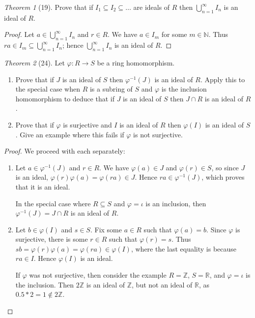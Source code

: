 \documentclass[12pt]{article}
\theoremstyle{remark}
\theoremstyle{named}
\newtheorem*{theorem}{Theorem}
\newcommand{\Z}{\mathbb Z}
\begin{document}
\begin{theorem}[19]
    Prove that if \(I_1 \subseteq I_2 \subseteq \dots\) are ideals of \(R\) then \(\bigcup_{n = 1}^\infty I_n\) is an ideal of \(R\).
\end{theorem}

\begin{proof}
    Let \(a \in \bigcup_{n = 1}^\infty I_n\) and \(r \in R\). We have \(a \in I_m\) for some \(m \in \mathbb N\). Thus \(ra \in I_m \subseteq \bigcup_{n = 1}^\infty I_n\); hence \(\bigcup_{n = 1}^\infty I_n\) is an ideal of \(R\).
\end{proof}


\begin{theorem}[24]
    Let \(\varphi : R \to S\) be a ring homomorphism.
    \begin{enumerate}
        \item Prove that if \(J\) is an ideal of \(S\) then \(\varphi^{-1}(J)\) is an ideal of \(R\). Apply this to the special case when \(R\) is a subring of \(S\) and \(\varphi\) is the inclusion homomorphism to deduce that if \(J\) is an ideal of \(S\) then \(J \cap R\) is an ideal of \(R\). 
        \item Prove that if \(\varphi\) is surjective and \(I\) is an ideal of \(R\) then \(\varphi(I)\) is an ideal of \(S\). Give an example where this fails if \(\varphi\) is not surjective.
    \end{enumerate}
\end{theorem}

\begin{proof}
    We proceed with each separately:
    \begin{enumerate}
        \item Let \(a \in \varphi^{-1}(J)\) and \(r \in R\). We have \(\varphi(a) \in J\) and \(\varphi(r) \in S\), so since \(J\) is an ideal, \(\varphi(r)\varphi(a) = \varphi(ra) \in J\). Hence \(ra \in \varphi^{-1}(J)\), which proves that it is an ideal. 
        
        In the special case where \(R \subseteq S\) and \(\varphi = \iota\) is an inclusion, then \(\varphi^{-1}(J) = J \cap R\) is an ideal of \(R\).

        \item Let \(b \in \varphi(I)\) and \(s \in S\). Fix some \(a \in R\) such that \(\varphi(a) = b\). Since \(\varphi\) is surjective, there is some \(r \in R\) such that \(\varphi(r) = s\). Thus \(sb = \varphi(r)\varphi(a) = \varphi(ra) \in \varphi(I)\), where the last equality is because \(ra \in I\). Hence \(\varphi(I)\) is an ideal. 
        
        If \(\varphi\) was not surjective, then consider the example \(R = \Z\), \(S = \mathbb R\), and \(\varphi = \iota\) is the inclusion. Then \(2\Z\) is an ideal of \(\Z\), but not an ideal of \(\mathbb R\), as \(0.5 * 2 = 1 \notin 2\Z\).
    \end{enumerate}
\end{proof}
\end{document}
